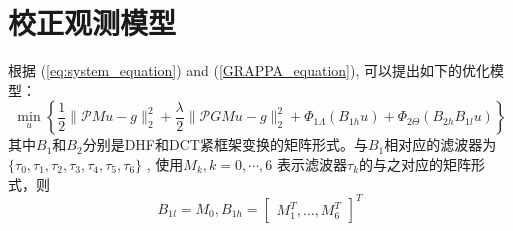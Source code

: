 \documentclass[UTF8]{article}
\begin{document}
\section{校正观测模型}
\par 根据 (\ref{eq:system_equation}) and (\ref{GRAPPA_equation}), 可以提出如下的优化模型：
\begin{equation}\label{mod_double_reg}
	\min_{u} \left\{\frac{1}{2}\|\mathcal{P}Mu-g\|_2^2+  \frac{\lambda}{2}\|\mathcal{P}GMu-g \|_2^2 + \Phi_{1 \Lambda}(B_{1h} u) + \Phi_{2 \Theta}(B_{2h}B_{1l} u) \right\} 
\end{equation}
其中$B_1$和$B_2$分别是DHF和DCT紧框架变换的矩阵形式。与$B_1$相对应的滤波器为$\{ \tau_0, \tau_1, \tau_2, \tau_3, \tau_4, \tau_5, \tau_6 \}$ , 使用$M_k, k= 0, \cdots, 6$ 表示滤波器$\tau_k$的与之对应的矩阵形式，则
\begin{equation*}
	B_{1l} = M_0 ,B_{1h} = \begin{bmatrix} M_{1}^{T}, \dots ,M_{6}^{T} \end{bmatrix}^T
\end{equation*}
\end{document}
